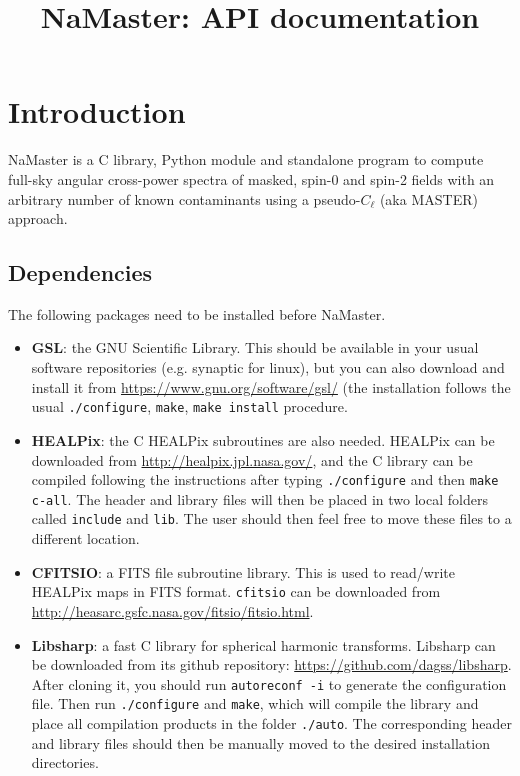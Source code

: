 \documentclass[a4paper,10pt]{article}
\title{NaMaster: API documentation}
\begin{document}
\maketitle

\section{Introduction}

NaMaster is a C library, Python module and standalone program to compute full-sky angular cross-power spectra of masked, spin-0 and spin-2 fields with an arbitrary number of known contaminants using a pseudo-$C_\ell$ (aka MASTER) approach.

\subsection{Dependencies}
The following packages need to be installed before NaMaster.
\begin{itemize}
  \item {\bf GSL}: the GNU Scientific Library. This should be available in your usual software repositories (e.g. synaptic for linux), but you can also download and install it from \url{https://www.gnu.org/software/gsl/} (the installation follows the usual {\tt ./configure}, {\tt make}, {\tt make install} procedure.
  \item {\bf HEALPix}: the C HEALPix subroutines are also needed. HEALPix can be downloaded from \url{http://healpix.jpl.nasa.gov/}, and the C library can be compiled following the instructions after typing {\tt ./configure} and then {\tt make c-all}. The header and library files will then be placed in two local folders called {\tt include} and {\tt lib}. The user should then feel free to move these files to a different location.
  \item {\bf CFITSIO}: a FITS file subroutine library. This is used to read/write HEALPix maps in FITS format. {\tt cfitsio} can be downloaded from \url{http://heasarc.gsfc.nasa.gov/fitsio/fitsio.html}.
  \item {\bf Libsharp}: a fast C library for spherical harmonic transforms. Libsharp can be downloaded from its github repository: \url{https://github.com/dagss/libsharp}. After cloning it, you should run {\tt autoreconf -i} to generate the configuration file. Then run {\tt ./configure} and {\tt make}, which will compile the library and place all compilation products in the folder {\tt ./auto}. The corresponding header and library files should then be manually moved to the desired installation directories.
\end{itemize}
\end{document}
